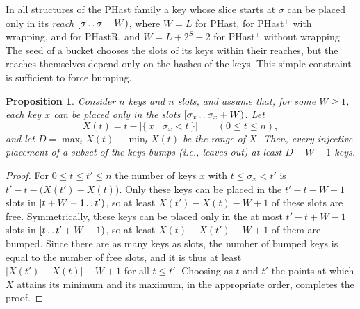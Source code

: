 \documentclass[11pt]{article}
\def\..{\,\mathpunct{\ldotp\ldotp}} %
\newcommand{\PHast}{PHast\xspace}
\newcommand{\PHastP}{PHast$^+$\xspace}
\newcommand{\PHastR}{PHastR\xspace}
\newtheorem{proposition}{Proposition}
\begin{document}
In all structures of the \PHast family a key whose slice starts at $\sigma$
can be placed only in its \emph{reach} $[\sigma\..\sigma+W)$, where $W=L$ for
\PHast, for \PHastP with wrapping, and for \PHastR, and $W=L+2^S-2$ for
\PHastP without wrapping. The seed of a bucket chooses the slots of its keys
within their reaches, but the reaches themselves depend only on the hashes of
the keys. This simple constraint is sufficient to force bumping.

\begin{proposition}
\label{prop:bump}
Consider $n$ keys and $n$ slots, and assume that, for some $W\geq 1$, each key
$x$ can be placed only in the slots $[\sigma_x\..\sigma_x+W)$. Let
\[
X(t) = t - \bigl|\{\,x \mid \sigma_x < t\,\}\bigr|\qquad (0\leq t\leq n),
\]
and let $D=\max_t X(t)-\min_t X(t)$ be the range of $X$. Then, every injective
placement of a subset of the keys bumps (i.e., leaves out) at least $D-W+1$
keys.
\end{proposition}

\begin{proof}
For $0\leq t\leq t'\leq n$ the number of keys $x$ with $t\leq\sigma_x<t'$ is
$t'-t-\bigl(X(t')-X(t)\bigr)$. Only these keys can be placed in the $t'-t-W+1$
slots in $[t+W-1\..t')$, so at least $X(t')-X(t)-W+1$ of these slots are free.
Symmetrically, these keys can be placed only in the at most $t'-t+W-1$ slots
in $[t\..t'+W-1)$, so at least $X(t)-X(t')-W+1$ of them are bumped. Since there
are as many keys as slots, the number of bumped keys is equal to the number of
free slots, and it is thus at least $\bigl|X(t')-X(t)\bigr|-W+1$ for all
$t\leq t'$. Choosing as $t$ and $t'$ the points at which $X$ attains its
minimum and its maximum, in the appropriate order, completes the proof.
\end{proof}
\end{document}
